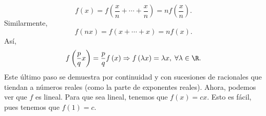 \begin{eg}
\begin{description}
\[f\left(x\right) = f\left(\frac{x}{n} + \cdots + \frac{x}{n}\right) = n f\left(\frac{x}{n}\right) .\]
Similarmente, 
\[f\left(nx\right) = f\left(x+\cdots + x\right) = nf\left(x\right) .\]
Así, 
\[f\left(\frac{p}{q}x\right) = \frac{p}{q}f\left(x\right) \Rightarrow f\left(\lambda x\right)= \lambda x, \; \forall \lambda \in \R .\]
Este último paso se demuestra por continuidad y con sucesiones de racionales que tiendan a números reales (como la parte de exponentes reales). Ahora, podemos ver que $\displaystyle f $ es lineal. Para que sea lineal, tenemos que $\displaystyle f\left(x\right) = cx $. Esto es fácil, pues tenemos que $\displaystyle f\left(1\right) = c $.
\end{description}
\end{eg}

